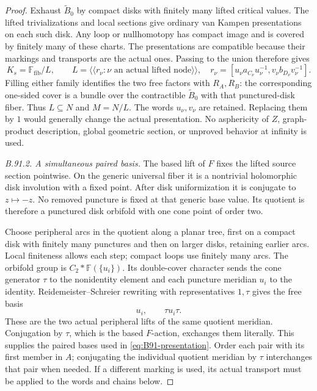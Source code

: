 \begin{proof}
Exhaust $\widetilde B_0$ by compact disks with finitely many lifted
critical values. The lifted trivializations and local sections give
ordinary van Kampen presentations on each such disk. Any loop or
nullhomotopy has compact image and is covered by finitely many of
these charts. The presentations are compatible because their
markings and transports are the actual ones. Passing to the union
therefore gives
\begin{equation}\label{eq:B91-group-presentation}
 K_s=\mathbb F_{\mathrm{fib}}/L,\qquad
 L=\langle\!\langle r_\nu:\nu\text{ an actual lifted node}\rangle\!\rangle,
 \quad
 r_\nu=[u_\nu a_{C_\nu}u_\nu^{-1},
               v_\nu b_{D_\nu}v_\nu^{-1}].
\end{equation}
Filling either family identifies the two free factors with $R_A,R_B$:
the corresponding one-sided cover is a bundle over the contractible
$\widetilde B_0$ with that punctured-disk fiber. Thus $L\subseteq N$
and $M=N/L$. The words $u_\nu,v_\nu$ are retained. Replacing them
by $1$ would generally change the actual presentation. No
asphericity of $Z$, graph-product description, global geometric
section, or unproved behavior at infinity is used.

\emph{B.91.2. A simultaneous paired basis.}
The based lift of $F$ fixes the lifted source section pointwise.
On the generic universal fiber it is a nontrivial holomorphic disk
involution with a fixed point. After disk uniformization it is
conjugate to $z\mapsto-z$. No removed puncture is fixed at that
generic base value. Its quotient is therefore a punctured disk
orbifold with one cone point of order two.

Choose peripheral arcs in the quotient along a planar tree, first
on a compact disk with finitely many punctures and then on larger
disks, retaining earlier arcs. Local finiteness allows each step;
compact loops use finitely many arcs. The orbifold group is
$C_2*\mathbb F(\{u_i\})$. Its double-cover character sends the cone
generator $\tau$ to the nonidentity element and each puncture
meridian $u_i$ to the identity. Reidemeister--Schreier rewriting
with representatives $1,\tau$ gives the free basis
\[
                       u_i,\qquad \tau u_i\tau .
\]
These are the two actual peripheral lifts of the same quotient
meridian. Conjugation by $\tau$, which is the based $F$-action,
exchanges them literally. This supplies the paired bases used in
\eqref{eq:B91-presentation}. Order each pair with its first member
in $A$; conjugating the individual quotient meridian by $\tau$
interchanges that pair when needed. If a different marking is used, its
actual transport must be applied to the words and chains below.


\end{proof}

